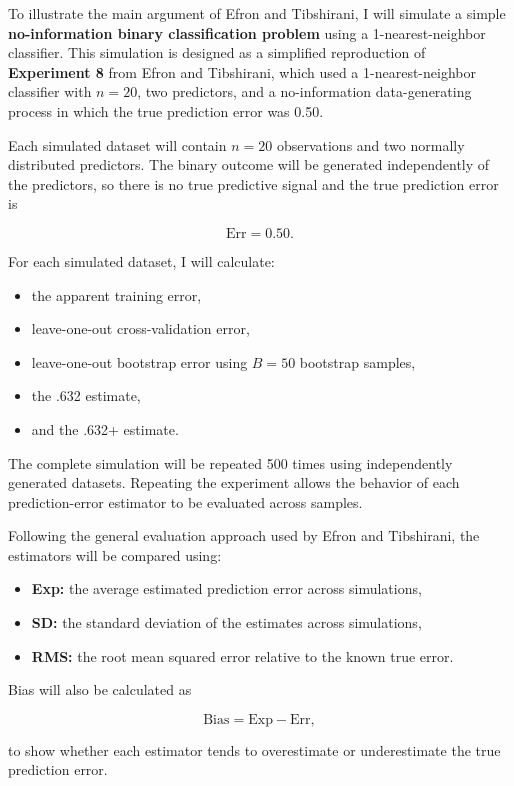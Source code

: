\documentclass[
  letterpaper,
  DIV=11,
  numbers=noendperiod]{scrreprt}
\providecommand{\tightlist}{%
  \setlength{\itemsep}{0pt}\setlength{\parskip}{0pt}}
\begin{document}
To illustrate the main argument of Efron and Tibshirani, I will simulate
a simple \textbf{no-information binary classification problem} using a
1-nearest-neighbor classifier. This simulation is designed as a
simplified reproduction of \textbf{Experiment 8} from Efron and
Tibshirani, which used a 1-nearest-neighbor classifier with \(n=20\),
two predictors, and a no-information data-generating process in which
the true prediction error was 0.50.

Each simulated dataset will contain \(n=20\) observations and two
normally distributed predictors. The binary outcome will be generated
independently of the predictors, so there is no true predictive signal
and the true prediction error is

\[
\mathrm{Err}=0.50.
\]

For each simulated dataset, I will calculate:

\begin{itemize}
\tightlist
\item
  the apparent training error,
\item
  leave-one-out cross-validation error,
\item
  leave-one-out bootstrap error using \(B=50\) bootstrap samples,
\item
  the .632 estimate,
\item
  and the .632+ estimate.
\end{itemize}

The complete simulation will be repeated 500 times using independently
generated datasets. Repeating the experiment allows the behavior of each
prediction-error estimator to be evaluated across samples.

Following the general evaluation approach used by Efron and Tibshirani,
the estimators will be compared using:

\begin{itemize}
\tightlist
\item
  \textbf{Exp:} the average estimated prediction error across
  simulations,
\item
  \textbf{SD:} the standard deviation of the estimates across
  simulations,
\item
  \textbf{RMS:} the root mean squared error relative to the known true
  error.
\end{itemize}

Bias will also be calculated as

\[
\mathrm{Bias}
=
\mathrm{Exp}
-
\mathrm{Err},
\]

to show whether each estimator tends to overestimate or underestimate
the true prediction error.
\end{document}
